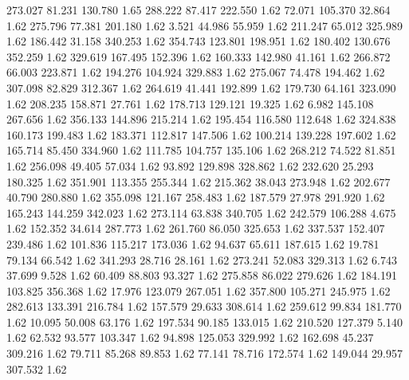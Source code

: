  273.027   81.231  130.780         1.65
 288.222   87.417  222.550         1.62
  72.071  105.370   32.864         1.62
 275.796   77.381  201.180         1.62
   3.521   44.986   55.959         1.62
 211.247   65.012  325.989         1.62
 186.442   31.158  340.253         1.62
 354.743  123.801  198.951         1.62
 180.402  130.676  352.259         1.62
 329.619  167.495  152.396         1.62
 160.333  142.980   41.161         1.62
 266.872   66.003  223.871         1.62
 194.276  104.924  329.883         1.62
 275.067   74.478  194.462         1.62
 307.098   82.829  312.367         1.62
 264.619   41.441  192.899         1.62
 179.730   64.161  323.090         1.62
 208.235  158.871   27.761         1.62
 178.713  129.121   19.325         1.62
   6.982  145.108  267.656         1.62
 356.133  144.896  215.214         1.62
 195.454  116.580  112.648         1.62
 324.838  160.173  199.483         1.62
 183.371  112.817  147.506         1.62
 100.214  139.228  197.602         1.62
 165.714   85.450  334.960         1.62
 111.785  104.757  135.106         1.62
 268.212   74.522   81.851         1.62
 256.098   49.405   57.034         1.62
  93.892  129.898  328.862         1.62
 232.620   25.293  180.325         1.62
 351.901  113.355  255.344         1.62
 215.362   38.043  273.948         1.62
 202.677   40.790  280.880         1.62
 355.098  121.167  258.483         1.62
 187.579   27.978  291.920         1.62
 165.243  144.259  342.023         1.62
 273.114   63.838  340.705         1.62
 242.579  106.288    4.675         1.62
 152.352   34.614  287.773         1.62
 261.760   86.050  325.653         1.62
 337.537  152.407  239.486         1.62
 101.836  115.217  173.036         1.62
  94.637   65.611  187.615         1.62
  19.781   79.134   66.542         1.62
 341.293   28.716   28.161         1.62
 273.241   52.083  329.313         1.62
   6.743   37.699    9.528         1.62
  60.409   88.803   93.327         1.62
 275.858   86.022  279.626         1.62
 184.191  103.825  356.368         1.62
  17.976  123.079  267.051         1.62
 357.800  105.271  245.975         1.62
 282.613  133.391  216.784         1.62
 157.579   29.633  308.614         1.62
 259.612   99.834  181.770         1.62
  10.095   50.008   63.176         1.62
 197.534   90.185  133.015         1.62
 210.520  127.379    5.140         1.62
  62.532   93.577  103.347         1.62
  94.898  125.053  329.992         1.62
 162.698   45.237  309.216         1.62
  79.711   85.268   89.853         1.62
  77.141   78.716  172.574         1.62
 149.044   29.957  307.532         1.62
